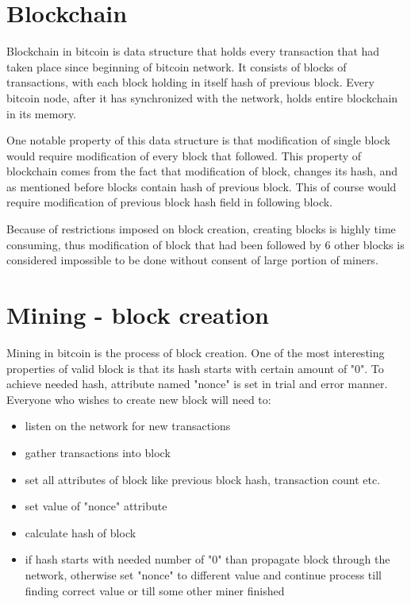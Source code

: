 \documentclass[12pt, en, eng, oneside]{mgr}
\begin{document}
\section{Blockchain}
Blockchain in bitcoin is data structure that holds every transaction that had taken place since beginning of bitcoin network. It consists of blocks of transactions, with each block holding in itself hash of previous block. Every bitcoin node, after it has synchronized with the network, holds entire blockchain in its memory.

One notable property of this data structure is that modification of single block would require modification of every block that followed. This property of blockchain comes from the fact that modification of block, changes its hash, and as mentioned before blocks contain hash of previous block. This of course would require modification of previous block hash field in following block. 

Because of restrictions imposed on block creation, creating blocks is highly time consuming, thus modification of block that had been followed by 6 other blocks is considered impossible to be done without consent of large portion of miners.

\section{Mining - block creation}
Mining in bitcoin is the process of block creation. One of the most interesting properties of valid block is that its hash starts with certain amount of "0". To achieve needed hash, attribute named "nonce" is set in trial and error manner. Everyone who wishes to create new block will need to:

\begin{itemize}
\item
listen on the network for new transactions
\item
gather transactions into block
\item
set all attributes of block like previous block hash, transaction count etc.
\item
set value of "nonce" attribute
\item
calculate hash of block
\item
if hash starts with needed number of "0" than propagate block through the network, otherwise set "nonce" to different value and continue process till finding correct value or till some other miner finished 
\end{itemize}
\end{document}
